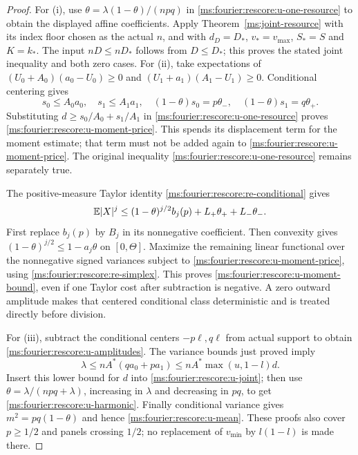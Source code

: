 \begin{proof}
For (i), use $\theta=\lambda(1-\theta)/(npq)$ in
\eqref{ms:fourier:rescore:u-one-resource} to obtain the displayed affine
coefficients. Apply Theorem~\ref{ms:joint-resource} with its index floor
chosen as the actual $n$, and with $d_D=D_*$, $v_*=v_{\max}$,
$S_*=S$ and $K=k_*$. The input $nD\le nD_*$ follows from $D\le D_*$;
this proves the stated joint inequality and both zero cases.
For (ii), take expectations of
$(U_0+A_0)(a_0-U_0)\ge0$ and
$(U_1+a_1)(A_1-U_1)\ge0$.  Conditional centering gives
\[
 s_0\le A_0a_0,\quad s_1\le A_1a_1,\quad
 (1-\theta)s_0=p\theta_-,\quad(1-\theta)s_1=q\theta_+.
\]
Substituting $d\ge s_0/A_0+s_1/A_1$ in
\eqref{ms:fourier:rescore:u-one-resource} proves \eqref{ms:fourier:rescore:u-moment-price}.
This spends its displacement term for the moment estimate; that term
must not be added again to \eqref{ms:fourier:rescore:u-moment-price}.
The original inequality \eqref{ms:fourier:rescore:u-one-resource} remains separately true.

The positive-measure Taylor identity
\eqref{ms:fourier:rescore:re-conditional} gives
\[
 \mathbb E|X|^j\le(1-\theta)^{j/2}b_j(p)
                          +L_+\theta_++L_-\theta_-.
\]
First replace $b_j(p)$ by $B_j$ in its nonnegative coefficient.
Then convexity gives $(1-\theta)^{j/2}\le1-a_j\theta$ on
$[0,\Theta]$.  Maximize the remaining linear functional over the
nonnegative signed variances subject to \eqref{ms:fourier:rescore:u-moment-price},
using \eqref{ms:fourier:rescore:re-simplex}.  This proves
\eqref{ms:fourier:rescore:u-moment-bound}, even if one Taylor cost after subtraction is
negative.  A zero outward amplitude makes that centered conditional
class deterministic and is treated directly before division.

For (iii), subtract the conditional centers $-p\ell,q\ell$ from
actual support to obtain \eqref{ms:fourier:rescore:u-amplitudes}.  The variance bounds
just proved imply
\[
 \lambda\le nA^*(qa_0+pa_1)
          \le nA^*\max(u,1-l)d.
\]
Insert this lower bound for $d$ into \eqref{ms:fourier:rescore:u-joint}; then use
$\theta=\lambda/(npq+\lambda)$, increasing in $\lambda$ and
decreasing in $pq$, to get \eqref{ms:fourier:rescore:u-harmonic}.
Finally conditional variance gives $m^2=pq(1-\theta)$ and hence
\eqref{ms:fourier:rescore:u-mean}.  These proofs also cover $p\ge1/2$ and panels crossing
$1/2$; no replacement of $v_{\min}$ by $l(1-l)$ is made there.
\end{proof}

